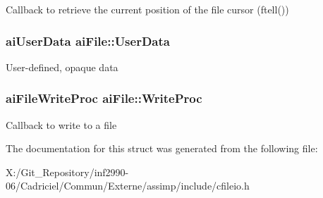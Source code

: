 Callback to retrieve the current position of the file cursor (ftell()) \hypertarget{structai_file_aec528fa18f4755fe4f28d604fde28aad}{
\subsubsection[{User\-Data}]{\setlength{\rightskip}{0pt plus 5cm}ai\-User\-Data ai\-File\-::\-User\-Data}}\label{structai_file_aec528fa18f4755fe4f28d604fde28aad}
User-\/defined, opaque data \hypertarget{structai_file_ab9fca3a62e34a33592c13a6f31db7d1d}{
\subsubsection[{Write\-Proc}]{\setlength{\rightskip}{0pt plus 5cm}ai\-File\-Write\-Proc ai\-File\-::\-Write\-Proc}}\label{structai_file_ab9fca3a62e34a33592c13a6f31db7d1d}
Callback to write to a file 

The documentation for this struct was generated from the following file\-:\begin{DoxyCompactItemize}
\item 
X\-:/\-Git\-\_\-\-Repository/inf2990-\/06/\-Cadriciel/\-Commun/\-Externe/assimp/include/cfileio.\-h\end{DoxyCompactItemize}
